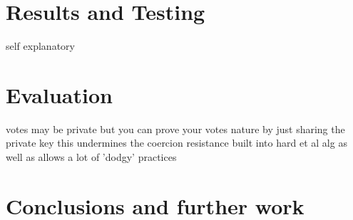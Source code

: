\documentclass{entcs}
\begin{document}
\section{Results and Testing}
self explanatory 


\section{Evaluation}
votes may be private but you can prove your votes nature by just sharing the private key this undermines the coercion resistance built into hard et al alg as well as allows a lot of 'dodgy' practices



\section{Conclusions and further work}

\printbibliography
\end{document}
